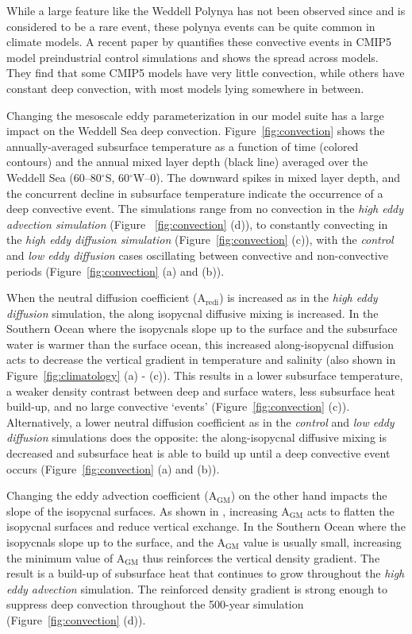 While a large feature like the Weddell Polynya has not been observed since and is considered to be a
rare event, these polynya events can be quite common in climate models. A recent
paper by \citet{DeLavergne2014a} quantifies these convective events in CMIP5
model preindustrial control simulations and shows the spread across models. They
find that some CMIP5 models have very little convection, while others have
constant deep convection, with most models lying somewhere in between.

Changing the mesoscale eddy parameterization in our model suite has a large
impact on the Weddell Sea deep convection. Figure~\ref{fig:convection} shows the
annually-averaged subsurface temperature as a function of time (colored
contours) and the annual mixed layer depth (black line) averaged over the
Weddell Sea (60--80$^{\circ{}}$S, 60$^{\circ{}}$W--0). The downward spikes in
mixed layer depth, and the concurrent decline in subsurface temperature indicate
the occurrence of a deep convective event. The simulations range from no
convection in the \textit{high eddy advection simulation} (Figure
~\ref{fig:convection} (d)), to constantly convecting in the \textit{high eddy
diffusion simulation} (Figure~\ref{fig:convection} (c)), with the
\textit{control} and \textit{low eddy diffusion} cases oscillating between
convective and non-convective periods (Figure~\ref{fig:convection} (a) and (b)).

When the neutral diffusion coefficient (A$_{\mathrm{redi}}$) is increased as in
the \textit{high eddy diffusion} simulation, the along isopycnal diffusive
mixing is increased. In the Southern Ocean where the isopycnals slope up to the
surface and the subsurface water is warmer than the surface ocean, this
increased along-isopycnal diffusion acts to decrease the vertical gradient in
temperature and salinity (also shown in Figure~\ref{fig:climatology} (a) - (c)).
This results in a lower subsurface temperature,
a weaker density contrast between deep and surface waters, less subsurface heat
build-up, and no large convective `events'
(Figure~\ref{fig:convection} (c)). Alternatively, a lower  neutral
diffusion coefficient as in the \textit{control} and \textit{low eddy diffusion}
simulations does the opposite: the along-isopycnal diffusive mixing is decreased
and subsurface heat is able to build up until a deep convective event occurs
(Figure~\ref{fig:convection} (a) and (b)).

Changing the eddy advection coefficient
(A$_{\mathrm{GM}}$) on the other hand impacts the slope of the isopycnal
surfaces. As shown in \citet{Gent2010d}, increasing A$_{\mathrm{GM}}$ acts to
flatten the isopycnal surfaces and reduce vertical exchange. In the Southern
Ocean where the isopycnals slope up to the surface, and the A$_{\mathrm{GM}}$
value is usually small, increasing the minimum value of A$_{\mathrm{GM}}$ thus
reinforces the vertical density gradient. The result is a build-up of subsurface
heat that continues to grow throughout the \textit{high eddy advection}
simulation. The reinforced density gradient is strong enough to suppress deep
convection throughout the 500-year simulation (Figure~\ref{fig:convection} (d)).

